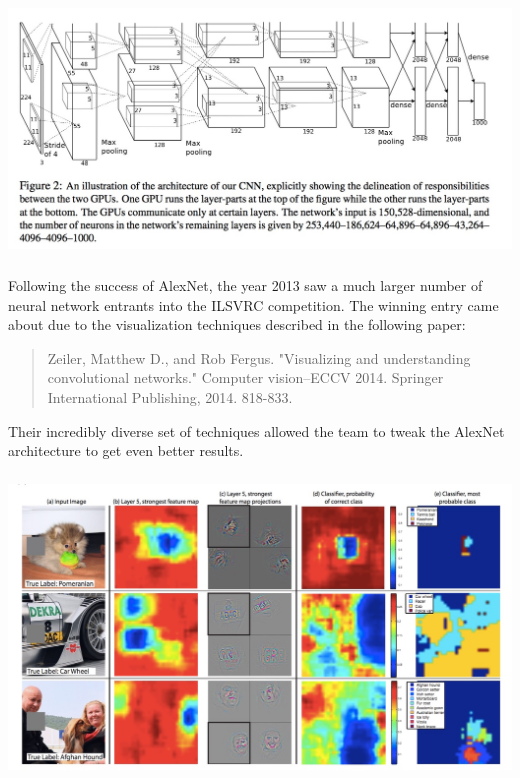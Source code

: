 \documentclass[xetex,mathserif,serif,aspectratio=169]{beamer}
\begin{document}
\begin{frame}[fragile] \frametitle{} \oldB \small

\begin{center}
\includegraphics[width=\textwidth]{img/alexNet.jpg}
\end{center}

\end{frame}

\begin{frame}[fragile] \frametitle{} \oldB \small


Following the success of AlexNet, the year 2013 saw a much
larger number of neural network entrants into the ILSVRC
competition. The winning entry came about due to the
visualization techniques described in the following paper:
\begin{quote}
Zeiler, Matthew D., and Rob Fergus. "Visualizing and understanding convolutional networks." Computer vision–ECCV 2014. Springer International Publishing, 2014. 818-833.
\end{quote}
Their incredibly diverse set of techniques allowed the team
to tweak the AlexNet architecture to get even better results.

\end{frame}

\begin{frame}[fragile] \frametitle{} \oldB \small

\begin{center}
\includegraphics[width=\textwidth]{img/vizCover.jpg}
\end{center}

\end{frame}
\end{document}

